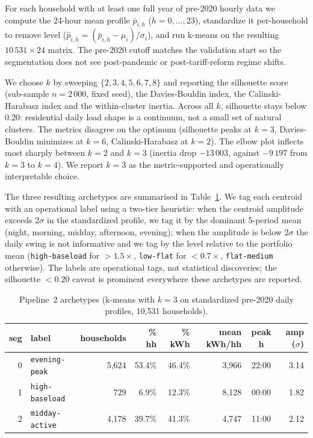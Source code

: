 \documentclass[11pt]{article}
\begin{document}
For each household with at least one full year of pre-2020 hourly data we
compute the 24-hour mean profile $\bar{p}_{i, h}$
($h = 0, \ldots, 23$), standardize it per-household to remove level
($\hat{p}_{i, h} = (\bar{p}_{i, h} - \mu_i) / \sigma_i$), and run k-means
on the resulting $10\,531 \times 24$ matrix. The pre-2020 cutoff matches
the validation start so the segmentation does not see post-pandemic or
post-tariff-reform regime shifts.

We choose $k$ by sweeping $\{2, 3, 4, 5, 6, 7, 8\}$ and reporting the
silhouette score (sub-sample $n = 2\,000$, fixed seed), the
Davies-Bouldin index, the Calinski-Harabasz index and the within-cluster
inertia. Across all $k$, silhouette stays below 0.20: residential daily
load shape is a continuum, not a small set of natural clusters. The
metrics disagree on the optimum (silhouette peaks at $k = 3$,
Davies-Bouldin minimizes at $k = 6$, Calinski-Harabasz at $k = 2$). The
elbow plot inflects most sharply between $k = 2$ and $k = 3$ (inertia
drop $-13\,003$, against $-9\,197$ from $k = 3$ to $k = 4$). We report
$k = 3$ as the metric-supported and operationally interpretable choice.

The three resulting archetypes are summarised in Table~\ref{tab:archetypes}.
We tag each centroid with an operational label using a two-tier heuristic:
when the centroid amplitude exceeds 2$\sigma$ in the standardized profile,
we tag it by the dominant 5-period mean (night, morning, midday,
afternoon, evening); when the amplitude is below 2$\sigma$ the daily swing
is not informative and we tag by the level relative to the portfolio mean
(\texttt{high-baseload} for $> 1.5\times$, \texttt{low-flat} for
$< 0.7\times$, \texttt{flat-medium} otherwise). The labels are operational
tags, not statistical discoveries; the silhouette $< 0.20$ caveat is
prominent everywhere these archetypes are reported.

\begin{table}[t]
\centering
\caption{Pipeline~2 archetypes (k-means with $k = 3$ on standardized
pre-2020 daily profiles, 10,531 households).}
\label{tab:archetypes}
\small
\begin{tabular}{r l r r r r c r}
\toprule
seg & label & households & \% hh & \% kWh & mean kWh/hh & peak h & amp ($\sigma$) \\
\midrule
0 & \texttt{evening-peak}  & 5{,}624 & 53.4\% & 46.4\% & 3{,}966 & 22:00 & 3.14 \\
1 & \texttt{high-baseload} &   729 &  6.9\% & 12.3\% & 8{,}128 & 00:00 & 1.82 \\
2 & \texttt{midday-active} & 4{,}178 & 39.7\% & 41.3\% & 4{,}747 & 11:00 & 2.12 \\
\bottomrule
\end{tabular}
\end{table}
\end{document}
